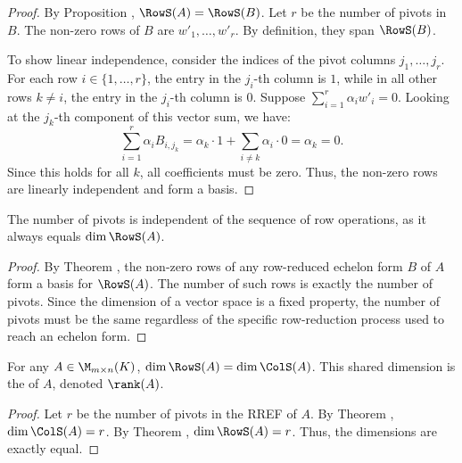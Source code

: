 \begin{proof}
By Proposition , $\RowS(A) = \RowS(B)$. Let $r$ be the number of pivots in $B$. The non-zero rows of $B$ are $w'_1, \dots, w'_r$. By definition, they span $\RowS(B)$. 

To show linear independence, consider the indices of the pivot columns $j_1, \dots, j_r$. For each row $i \in \{1, \dots, r\}$, the entry in the $j_i$-th column is $1$, while in all other rows $k \neq i$, the entry in the $j_i$-th column is $0$. 
Suppose $\sum_{i=1}^r \alpha_i w'_i = 0$. Looking at the $j_k$-th component of this vector sum, we have:
\[ \sum_{i=1}^r \alpha_i B_{i, j_k} = \alpha_k \cdot 1 + \sum_{i \neq k} \alpha_i \cdot 0 = \alpha_k = 0. \]
Since this holds for all $k$, all coefficients must be zero. Thus, the non-zero rows are linearly independent and form a basis.
\end{proof}

\begin{corollary}
\label{cor:rank_invariance}
The number of pivots is independent of the sequence of row operations, as it always equals $\dim \RowS(A)$.
\end{corollary}

\begin{proof}
By Theorem , the non-zero rows of any row-reduced echelon form $B$ of $A$ form a basis for $\RowS(A)$. The number of such rows is exactly the number of pivots. Since the dimension of a vector space is a fixed property, the number of pivots must be the same regardless of the specific row-reduction process used to reach an echelon form.
\end{proof}

\begin{theorem}
\label{thm:rank_equality}
For any $A \in \M_{m \times n}(K)$, $\dim \RowS(A) = \dim \ColS(A)$. This shared dimension is the  of $A$, denoted $\rank(A)$.
\end{theorem}
\begin{proof}
Let $r$ be the number of pivots in the RREF of $A$. By Theorem , $\dim \ColS(A) = r$. By Theorem , $\dim \RowS(A) = r$. Thus, the dimensions are exactly equal.
\end{proof}